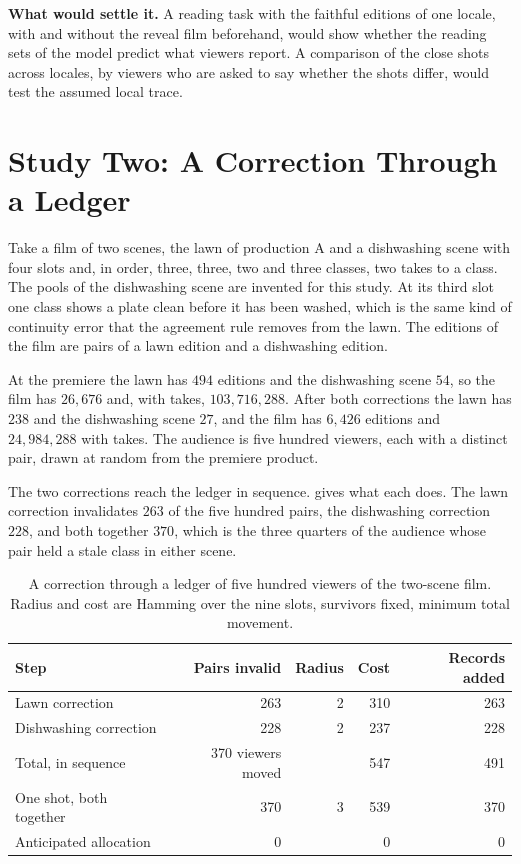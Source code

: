 \documentclass[11pt,twoside,openright]{book}
\theoremstyle{plain}
\theoremstyle{definition}
\theoremstyle{remark}
\begin{document}
\textbf{What would settle it.} A reading task with the faithful editions of one locale, with and without the reveal film beforehand, would show whether the reading sets of the model predict what viewers report. A comparison of the close shots across locales, by viewers who are asked to say whether the shots differ, would test the assumed local trace.

\section{Study Two: A Correction Through a Ledger}\label{sec:ledger17}

Take a film of two scenes, the lawn of production A and a dishwashing scene with four slots and, in order, three, three, two and three classes, two takes to a class. The pools of the dishwashing scene are invented for this study. At its third slot one class shows a plate clean before it has been washed, which is the same kind of continuity error that the agreement rule removes from the lawn. The editions of the film are pairs of a lawn edition and a dishwashing edition.

At the premiere the lawn has $494$ editions and the dishwashing scene $54$, so the film has $26{,}676$ and, with takes, $103{,}716{,}288$. After both corrections the lawn has $238$ and the dishwashing scene $27$, and the film has $6{,}426$ editions and $24{,}984{,}288$ with takes. The audience is five hundred viewers, each with a distinct pair, drawn at random from the premiere product.

The two corrections reach the ledger in sequence.  gives what each does. The lawn correction invalidates $263$ of the five hundred pairs, the dishwashing correction $228$, and both together $370$, which is the three quarters of the audience whose pair held a stale class in either scene.

\begin{table}[ht]
\centering
\begin{tabular}{@{}lrrrr@{}}
\toprule
Step & Pairs invalid & Radius & Cost & Records added\\
\midrule
Lawn correction & 263 & 2 & 310 & 263\\
Dishwashing correction & 228 & 2 & 237 & 228\\
\midrule
Total, in sequence & 370 viewers moved & & 547 & 491\\
One shot, both together & 370 & 3 & 539 & 370\\
Anticipated allocation & 0 & & 0 & 0\\
\bottomrule
\end{tabular}
\caption{A correction through a ledger of five hundred viewers of the two-scene film. Radius and cost are Hamming over the nine slots, survivors fixed, minimum total movement.}\label{tab:ledger17}
\end{table}
\end{document}
